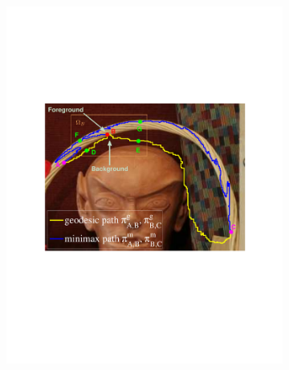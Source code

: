 \documentclass[preprint,10pt,5p,times,twocolumn]{elsarticle}
\begin{document}
\begin{figure}[t]
\centering
\begin{subfigure}[b]{0.35\linewidth}
    \includegraphics[width=\linewidth]{path1.pdf}
    \caption{}
    \label{fig:path:path}
\end{subfigure}%
\begin{subfigure}[b]{0.4\linewidth}

\end{subfigure}
\end{figure}
\end{document}
